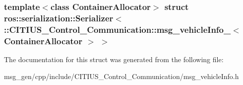 \subsubsection*{template$<$class Container\-Allocator$>$ struct ros\-::serialization\-::\-Serializer$<$ \-::\-C\-I\-T\-I\-U\-S\-\_\-\-Control\-\_\-\-Communication\-::msg\-\_\-vehicle\-Info\-\_\-$<$ Container\-Allocator $>$ $>$}



\-The documentation for this struct was generated from the following file\-:\begin{DoxyCompactItemize}
\item 
msg\-\_\-gen/cpp/include/\-C\-I\-T\-I\-U\-S\-\_\-\-Control\-\_\-\-Communication/msg\-\_\-vehicle\-Info.\-h\end{DoxyCompactItemize}
